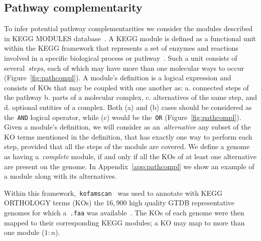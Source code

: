 \documentclass[sn-mathphys,Numbered]{sn-jnl}  %
\theoremstyle{thmstyleone}%
\theoremstyle{thmstyletwo}%
\theoremstyle{thmstylethree}%
\begin{document}
    \subsection*{Pathway complementarity}
    \label{subsec:path-compl}


        To infer potential pathway complementarities we consider the modules described in KEGG MODULES database~\cite{keggmodulesdb}.
        A KEGG module is defined as a functional unit within the KEGG framework that represents a set of enzymes and reactions involved in a specific biological process or pathway~\cite{muto2013modular}.
        Such a unit consists of several~\textit{steps}, each of which may have more than one molecular ways to occur (Figure~\ref{fig:pathcompl}).
        A module's definition is a logical expression and consists of KOs 
        that may be coupled with one another as:
            a. connected steps of the pathway
            b. parts of a molecular complex, 
            c. alternatives of the same step, and 
            d. optional entities of a complex.
        Both (a) and (b) cases should be considered as the~\texttt{AND} logical operator, while (c) would be the~\texttt{OR} (Figure~\ref{fig:pathcompl}).
        Given a module's definition, we will consider as an~\textit{alternative} any subset of the KO terms mentioned in the definition, 
        that has exactly one way to perform each step, provided that all the steps of the module are covered.
        We define a genome as having a~\textit{complete} module, if and only if all the KOs of at least one alternative are present on the genome.
        In Appendix~\ref{app:pathcompl} we show an example of a module along with its alternatives.

        Within this framework,~\texttt{kofamscan}~\cite{aramaki2020kofamkoala} was used to annotate with KEGG ORTHOLOGY terms (KOs) the $16,900$ high quality GTDB representative genomes for which a~\texttt{.faa} was available~\cite{kanehisa2012kegg}.
        The KOs of each genome were then mapped to their corresponding KEGG modules; a KO may map to more than one module ($1:n$).
\end{document}

